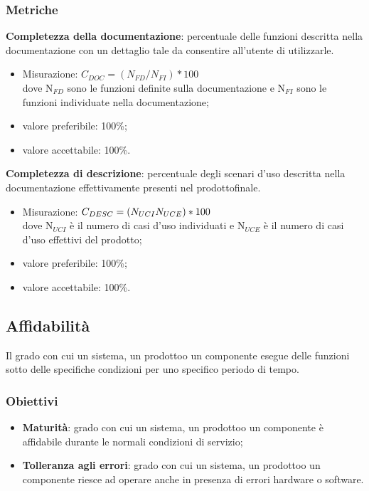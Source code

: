         \subsubsection{Metriche}
            \textbf{Completezza della documentazione}: percentuale delle funzioni descritta nella documentazione con un dettaglio tale da consentire all’utente di utilizzarle.
                \begin{itemize}
                    \item Misurazione: $C_{DOC}=(N_{FD}/N_{FI})*100$ \\
                    dove N$_{FD}$ sono le funzioni definite sulla documentazione e N$_{FI}$ sono le funzioni individuate nella documentazione;
                    \item valore preferibile: 100\%;
                    \item valore accettabile: 100\%.
                \end{itemize}
            \textbf{Completezza di descrizione}: percentuale degli scenari d’uso descritta nella documentazione effettivamente presenti nel prodotto\glosp finale.
                \begin{itemize}
                    \item Misurazione: $C_{DESC}=(N_{UCI}\\N_{UCE})*100$ \\
                    dove N$_{UCI}$ è il numero di casi d'uso individuati e N$_{UCE}$ è il numero di casi d'uso effettivi del prodotto\glo;
                    \item valore preferibile: 100\%;
                    \item valore accettabile: 100\%.
                \end{itemize}
    \subsection{Affidabilità}
        Il grado con cui un sistema, un prodotto\glosp o un componente esegue delle funzioni sotto delle specifiche condizioni per uno specifico periodo di tempo.
        \subsubsection{Obiettivi}
            \begin{itemize}
                \item \textbf{Maturità}: grado con cui un sistema, un prodotto\glosp o un componente è affidabile durante le normali condizioni di servizio;
                \item \textbf{Tolleranza agli errori}: grado con cui un sistema, un prodotto\glosp o un componente riesce ad operare anche in presenza di errori hardware o software.
            \end{itemize}
